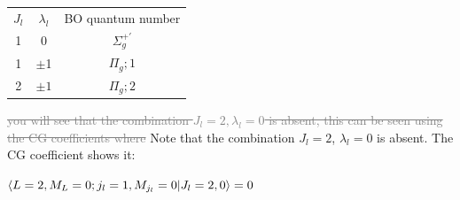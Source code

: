 \documentclass[11pt,a4paper]{article}
\newcommand{\aifix}[2]{\textcolor{gray}{\sout{#1}} \textcolor{aicolor}{#2}}
\newcommand{\aifix}[2]{#2}
\begin{document}
\begin{table}
	\centering
	\begin{tabular}{ccc}
		$J_l$ & $\lambda_l$ & BO quantum number \\
		1     & 0           & $\Sigma_g^{+'}$   \\
		1     & $\pm$1      & $\Pi_g ; 1$       \\
		2     & $\pm1$      & $\Pi_g; 2$
	\end{tabular}
\end{table}

\aifix{you will see that the combination $J_l = 2, \lambda_l = 0$ is absent, this can be seen using the CG coefficients where}{Note that the combination $J_l=2$, $\lambda_l=0$ is absent. The CG coefficient shows it:}

$\braket{L = 2,M_L = 0; j_l = 1, M_{j_l} = 0|J_l = 2, 0 } = 0$
\end{document}
